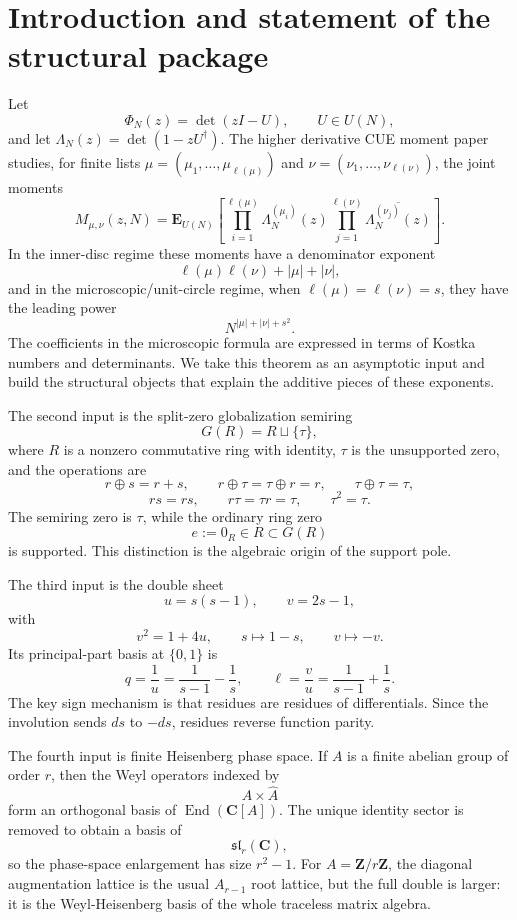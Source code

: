 \documentclass[11pt]{article}
\newcommand{\C}{\mathbf C}
\newcommand{\Z}{\mathbf Z}
\newcommand{\End}{\operatorname{End}}
\theoremstyle{plain}
\theoremstyle{definition}
\begin{document}
\tableofcontents

\section{Introduction and statement of the structural package}

Let
\[
   \Phi_N(z)=\det(zI-U),\qquad U\in U(N),
\]
and let \(\Lambda_N(z)=\det(1-zU^\dagger)\).  The higher derivative CUE moment paper studies, for finite lists
\(\mu=(\mu_1,\ldots,\mu_{\ell(\mu)})\) and \(\nu=(\nu_1,\ldots,\nu_{\ell(\nu)})\), the joint moments
\[
 M_{\mu,\nu}(z,N)=\mathbf E_{U(N)}\left[
     \prod_{i=1}^{\ell(\mu)}\Lambda_N^{(\mu_i)}(z)
     \prod_{j=1}^{\ell(\nu)}\overline{\Lambda_N^{(\nu_j)}(z)}
 \right].
\]
In the inner-disc regime these moments have a denominator exponent
\[
   \ell(\mu)\ell(\nu)+|\mu|+|\nu|,
\]
and in the microscopic/unit-circle regime, when \(\ell(\mu)=\ell(\nu)=s\), they have the leading power
\[
   N^{|\mu|+|\nu|+s^2}.
\]
The coefficients in the microscopic formula are expressed in terms of Kostka numbers and determinants.  We take this theorem as an asymptotic input and build the structural objects that explain the additive pieces of these exponents.

The second input is the split-zero globalization semiring
\[
   G(R)=R\sqcup\{\tau\},
\]
where \(R\) is a nonzero commutative ring with identity, \(\tau\) is the unsupported zero, and the operations are
\[
 r\oplus s=r+s,
 \qquad r\oplus\tau=\tau\oplus r=r,
 \qquad \tau\oplus\tau=\tau,
\]
\[
 rs=rs,
 \qquad r\tau=\tau r=\tau,
 \qquad \tau^2=\tau.
\]
The semiring zero is \(\tau\), while the ordinary ring zero
\[
   e:=0_R\in R\subset G(R)
\]
is supported.  This distinction is the algebraic origin of the support pole.

The third input is the double sheet
\[
   u=s(s-1),\qquad v=2s-1,
\]
with
\[
   v^2=1+4u,
   \qquad s\mapsto 1-s,
   \qquad v\mapsto -v.
\]
Its principal-part basis at \(\{0,1\}\) is
\[
   q=\frac1u=\frac1{s-1}-\frac1s,
   \qquad
   \ell=\frac vu=\frac1{s-1}+\frac1s.
\]
The key sign mechanism is that residues are residues of differentials.  Since the involution sends \(ds\) to \(-ds\), residues reverse function parity.

The fourth input is finite Heisenberg phase space.  If \(A\) is a finite abelian group of order \(r\), then the Weyl operators indexed by
\[
   A\times \widehat A
\]
form an orthogonal basis of \(\End(\C[A])\).  The unique identity sector is removed to obtain a basis of
\[
   \mathfrak{sl}_r(\C),
\]
so the phase-space enlargement has size \(r^2-1\).  For \(A=\Z/r\Z\), the diagonal augmentation lattice is the usual \(A_{r-1}\) root lattice, but the full double is larger: it is the Weyl-Heisenberg basis of the whole traceless matrix algebra.
\end{document}
